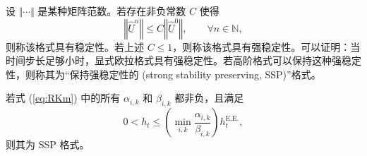 设 $\Vert\cdots\Vert$ 是某种矩阵范数。若存在非负常数 $C$ 使得
\begin{equation}
\left\Vert \underline{\hat{U}}^{n}\right\Vert \le C\left\Vert \underline{\hat{U}}^{0}\right\Vert ,\qquad\forall n\in\mathbb{N},
\end{equation}
则称该格式具有稳定性。若上述 $C\le1$，则称该格式具有强稳定性。可以证明：当时间步长足够小时，显式欧拉格式具有强稳定性。若高阶格式可以保持这种强稳定性，则称其为“保持强稳定性的
(strong stability preserving, SSP)”格式。
\begin{lem}
若式 (\ref{eq:RKm}) 中的所有 $\alpha_{i,k}$ 和 $\beta_{i,k}$ 都非负，且满足
\begin{equation}
0<h_{t}\le\left(\min_{i,k}\frac{\alpha_{i,k}}{\beta_{i,k}}\right)h_{t}^{\mathrm{E.E.}},
\end{equation}
则其为 SSP 格式。
\end{lem}

